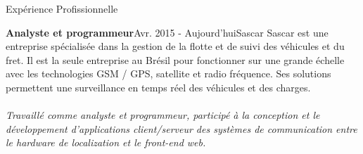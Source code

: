 \documentclass{resume}
\begin{document}
  \begin{rSection}{Expérience Profissionnelle}

    \begin{rSubsection}{\fontsize{12}{14}\selectfont \bf Analyste et programmeur}{\fontsize{12}{14}\selectfont Avr. 2015 - Aujourd'hui}{\fontsize{12}{14}\selectfont Sascar}{}
    Sascar est une entreprise spécialisée dans la gestion de la flotte et de suivi des véhicules et du fret. Il est la seule entreprise au Brésil pour fonctionner sur une grande échelle avec les technologies GSM / GPS, satellite et radio fréquence. Ses solutions permettent une surveillance en temps réel des véhicules et des charges.\\\\
    \textit{Travaillé comme analyste et programmeur, participé à la conception et le développement d’applications client/serveur des systèmes de communication entre le hardware de localization et le front-end web.}

    \end{rSubsection}


\end{rSection}
\end{document}
